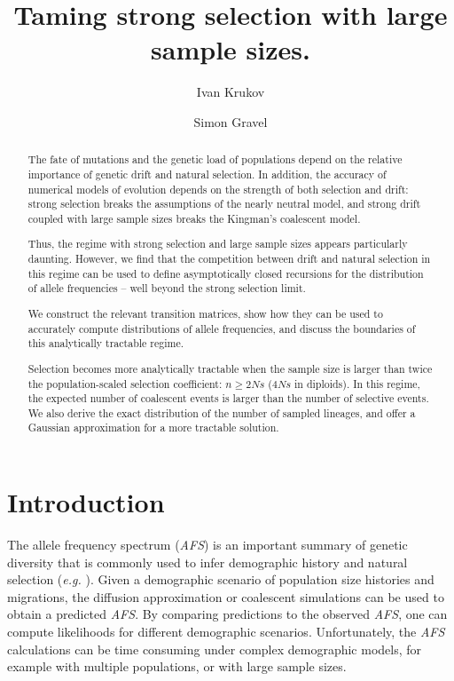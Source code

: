 \documentclass[review]{elsarticle}
\begin{document}
\begin{frontmatter}
  \title{ Taming strong selection with large sample sizes. }

  \author{Ivan Krukov}
  \author{Simon Gravel}

  \begin{abstract}
    The fate of mutations and the genetic load of populations depend on the relative importance of
    genetic drift and natural selection. In addition, the accuracy of numerical models of evolution
    depends on the strength of both selection and drift: strong selection breaks the assumptions of
    the nearly neutral model, and strong drift coupled with large sample sizes breaks the
    Kingman's coalescent model.
  
    Thus, the regime with strong selection and large sample sizes appears particularly daunting.
    However, we find that the competition between drift and natural selection in this regime can be
    used to define asymptotically closed recursions for the distribution of allele
    frequencies -- well beyond the strong selection limit.
 
    We construct the relevant transition matrices, show how they can be used to accurately compute
    distributions of allele frequencies, and discuss the boundaries of this analytically tractable
    regime.
  
    Selection becomes more analytically tractable when the sample size is larger than twice the
    population-scaled selection coefficient: $n \ge 2Ns$ ($4Ns$ in diploids). In this regime, the
    expected number of coalescent events is larger than the number of selective events. We also
    derive the exact distribution of the number of sampled lineages, and offer a Gaussian
    approximation for a more tractable solution.
  \end{abstract}

\end{frontmatter}

\section{Introduction}
\label{sec:introduciton}

The allele frequency spectrum (\textit{AFS}) is an important summary of genetic diversity that is
commonly used to infer demographic history and natural selection (\textit{e.g.}
\cite{GutenkunstEtAl2009, KammEtAl2017, JouganousEtAl2017}). Given a demographic scenario of
population size histories and migrations, the diffusion approximation or coalescent simulations can
be used to obtain a predicted \textit{AFS}. By comparing predictions to the observed \textit{AFS},
one can compute likelihoods for different demographic scenarios. Unfortunately, the \textit{AFS}
calculations can be time consuming under complex demographic models, for example with multiple
populations, or with large sample sizes.
\end{document}
